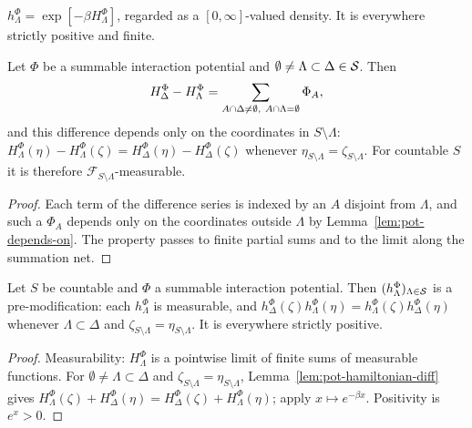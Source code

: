 \begin{definition}
    \label{def:pot-boltzmann-factor}
    \leanok

    $h_\Lambda^\Phi = \exp[-\beta H_\Lambda^\Phi]$, regarded as a $[0, \infty]$-valued density.
    It is everywhere strictly positive and finite.
\end{definition}

\begin{lemma}[Georgii (2.6)]
    \label{lem:pot-hamiltonian-diff}
    \leanok

    Let $\Phi$ be a summable interaction potential and $\emptyset \neq \Lambda \subset \Delta
    \in \mathcal{S}$. Then
    \[ H^\Phi_\Delta - H^\Phi_\Lambda = \sum_{A \cap \Delta \neq \emptyset,\
        A \cap \Lambda = \emptyset} \Phi_A , \]
    and this difference depends only on the coordinates in $S \setminus \Lambda$:
    $H^\Phi_\Lambda(\eta) - H^\Phi_\Lambda(\zeta) = H^\Phi_\Delta(\eta) -
    H^\Phi_\Delta(\zeta)$ whenever $\eta_{S \setminus \Lambda} = \zeta_{S \setminus \Lambda}$.
    For countable $S$ it is therefore $\mathcal{F}_{S \setminus \Lambda}$-measurable.
\end{lemma}
\begin{proof}
    \leanok

    Each term of the difference series is indexed by an $A$ disjoint from $\Lambda$, and such a
    $\Phi_A$ depends only on the coordinates outside $\Lambda$ by
    Lemma~\ref{lem:pot-depends-on}. The property passes to finite partial sums and to the limit
    along the summation net.
\end{proof}

\begin{proposition}
    \label{prop:pot-premodification}
    \leanok

    Let $S$ be countable and $\Phi$ a summable interaction potential. Then
    $(h_\Lambda^\Phi)_{\Lambda \in \mathcal{S}}$ is a pre-modification: each $h^\Phi_\Lambda$ is
    measurable, and $h_\Delta^\Phi(\zeta) h_\Lambda^\Phi(\eta) = h_\Lambda^\Phi(\zeta)
    h_\Delta^\Phi(\eta)$ whenever $\Lambda \subset \Delta$ and $\zeta_{S \setminus \Lambda} =
    \eta_{S \setminus \Lambda}$. It is everywhere strictly positive.
\end{proposition}
\begin{proof}
    \leanok

    Measurability: $H^\Phi_\Lambda$ is a pointwise limit of finite sums of measurable
    functions. For $\emptyset \neq \Lambda \subset \Delta$ and $\zeta_{S \setminus \Lambda} =
    \eta_{S \setminus \Lambda}$, Lemma~\ref{lem:pot-hamiltonian-diff} gives
    $H_\Lambda^\Phi(\zeta) + H_\Delta^\Phi(\eta) = H_\Delta^\Phi(\zeta) +
    H_\Lambda^\Phi(\eta)$; apply $x \mapsto e^{-\beta x}$. Positivity is $e^{x} > 0$.
\end{proof}

